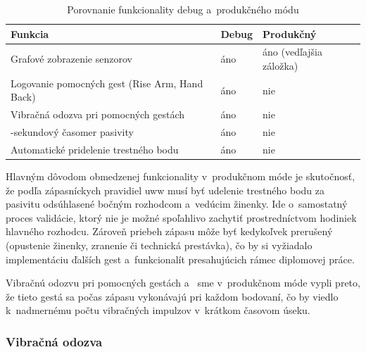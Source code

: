 \begin{table}[H]
  \centering
  \caption{Porovnanie funkcionality debug a~produkčného módu}
  \label{tab:rozdiely-modov}
  \renewcommand{\arraystretch}{1.4}
  \begin{tabularx}{\textwidth}{
      >{\raggedright\arraybackslash}X
      >{\centering\arraybackslash}p{}
      >{\centering\arraybackslash}p{}
    }
    \toprule
    \textbf{Funkcia}                                & \textbf{Debug} & \textbf{Produkčný} \\
    \midrule
    Grafové zobrazenie senzorov                     & áno            & áno (vedľajšia záložka)                \\
    \midrule
    Logovanie pomocných gest (Rise Arm, Hand Back)  & áno            & nie                \\
    \midrule
    Vibračná odozva pri pomocných gestách           & áno            & nie                \\
    \midrule
    30-sekundový časomer pasivity                   & áno            & nie                \\
    \midrule
    Automatické pridelenie trestného bodu           & áno            & nie                \\
    \bottomrule
  \end{tabularx}
\end{table}

Hlavným dôvodom obmedzenej funkcionality v~produkčnom móde
je skutočnosť, že podľa zápasníckych pravidiel \Gls{uww}
musí byť udelenie trestného bodu za pasivitu odsúhlasené
bočným rozhodcom a~vedúcim žinenky. Ide o~samostatný
proces validácie, ktorý nie je možné spoľahlivo zachytiť
prostredníctvom hodiniek hlavného rozhodcu. Zároveň
priebeh zápasu môže byť kedykoľvek prerušený (opustenie
žinenky, zranenie či technická prestávka), čo by si
vyžiadalo implementáciu ďalších gest a~funkcionalít
presahujúcich rámec diplomovej práce.

Vibračnú odozvu pri pomocných gestách 
a~ sme v~produkčnom móde vypli preto, že
tieto gestá sa počas zápasu vykonávajú pri každom
bodovaní, čo by viedlo k~nadmernému počtu vibračných
impulzov v~krátkom časovom úseku.

\subsubsection{Vibračná odozva}
\label{subsubsec:vibracna-odozva}

